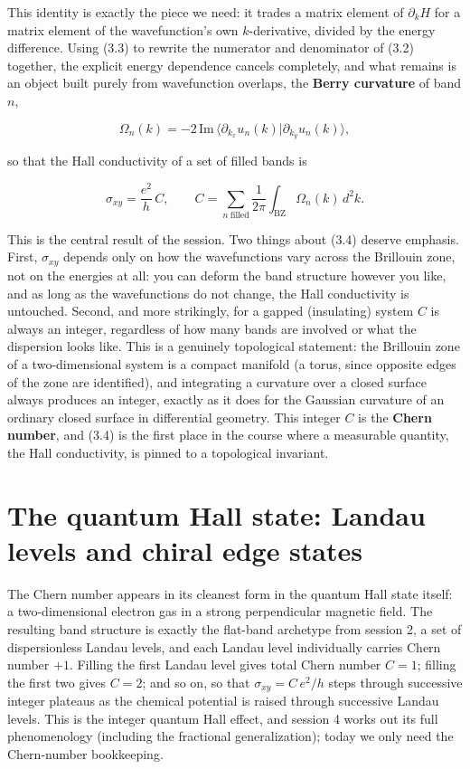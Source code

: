 This identity is exactly the piece we need: it trades a matrix element of $\partial_k H$ for a matrix
element of the wavefunction's own $k$-derivative, divided by the energy difference. Using (3.3) to
rewrite the numerator and denominator of (3.2) together, the explicit energy dependence cancels
completely, and what remains is an object built purely from wavefunction overlaps, the \textbf{Berry
curvature} of band $n$,

\begin{equation*}
\Omega_n(k) = -2\,\mathrm{Im}\, \langle \partial_{k_x} u_n(k)|\partial_{k_y} u_n(k)\rangle,
\end{equation*}

so that the Hall conductivity of a set of filled bands is

\begin{equation}
\sigma_{xy} = \frac{e^2}{h}\, C, \qquad
C = \sum_{n\ \text{filled}} \frac{1}{2\pi}\int_{\text{BZ}} \Omega_n(k)\, d^2k.
\end{equation}

This is the central result of the session. Two things about (3.4) deserve emphasis. First, $\sigma_{xy}$
depends only on how the wavefunctions vary across the Brillouin zone, not on the energies at all: you
can deform the band structure however you like, and as long as the wavefunctions do not change,
the Hall conductivity is untouched. Second, and more strikingly, for a gapped (insulating) system $C$
is always an integer, regardless of how many bands are involved or what the dispersion looks like.
This is a genuinely topological statement: the Brillouin zone of a two-dimensional system is a
compact manifold (a torus, since opposite edges of the zone are identified), and integrating a
curvature over a closed surface always produces an integer, exactly as it does for the Gaussian
curvature of an ordinary closed surface in differential geometry. This integer $C$ is the \textbf{Chern
number}, and (3.4) is the first place in the course where a measurable quantity, the Hall
conductivity, is pinned to a topological invariant.

\section{The quantum Hall state: Landau levels and chiral edge states}

The Chern number appears in its cleanest form in the quantum Hall state itself: a two-dimensional
electron gas in a strong perpendicular magnetic field. The resulting band structure is exactly the
flat-band archetype from session 2, a set of dispersionless Landau levels, and each Landau level
individually carries Chern number $+1$. Filling the first Landau level gives total Chern number $C=1$;
filling the first two gives $C=2$; and so on, so that $\sigma_{xy} = C\, e^2/h$ steps through
successive integer plateaus as the chemical potential is raised through successive Landau levels.
This is the integer quantum Hall effect, and session 4 works out its full phenomenology (including
the fractional generalization); today we only need the Chern-number bookkeeping.

